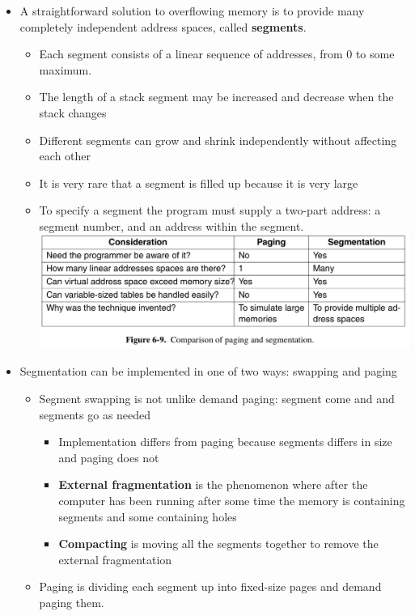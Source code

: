 \documentclass[11pt]{article}
\makeatletter
\def\maxwidth{\ifdim\Gin@nat@width>\linewidth\linewidth
    \else\Gin@nat@width\fi}
\let\Oldincludegraphics\includegraphics
\renewcommand{\includegraphics}[1]{\Oldincludegraphics[width=.8\maxwidth]{#1}}
\providecommand{\tightlist}{%
      \setlength{\itemsep}{0pt}\setlength{\parskip}{0pt}}
\makeatother
\begin{document}
\begin{itemize}
\tightlist
\item
  A straightforward solution to overflowing memory is to provide many
  completely independent address spaces, called \textbf{segments}.

  \begin{itemize}
  \tightlist
  \item
    Each segment consists of a linear sequence of addresses, from 0 to
    some maximum.
  \item
    The length of a stack segment may be increased and decrease when the
    stack changes
  \item
    Different segments can grow and shrink independently without
    affecting each other
  \item
    It is very rare that a segment is filled up because it is very large
  \item
    To specify a segment the program must supply a two-part address: a
    segment number, and an address within the segment.
    \includegraphics{img/paging_vs_segmentation.png}
  \end{itemize}
\item
  Segmentation can be implemented in one of two ways: swapping and
  paging

  \begin{itemize}
  \tightlist
  \item
    Segment swapping is not unlike demand paging: segment come and and
    segments go as needed

    \begin{itemize}
    \tightlist
    \item
      Implementation differs from paging because segments differs in
      size and paging does not
    \item
      \textbf{External fragmentation} is the phenomenon where after the
      computer has been running after some time the memory is containing
      segments and some containing holes
    \item
      \textbf{Compacting} is moving all the segments together to remove
      the external fragmentation
    \end{itemize}
  \item
    Paging is dividing each segment up into fixed-size pages and demand
    paging them.
  \end{itemize}
\end{itemize}
\end{document}
